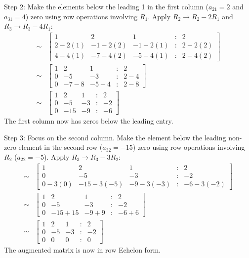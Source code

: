 \documentclass{article}
\begin{document}
Step 2: Make the elements below the leading 1 in the first column ($a_{21}=2$ and $a_{31}=4$) zero using row operations involving $R_1$.
Apply $R_2 \to R_2 - 2R_1$ and $R_3 \to R_3 - 4R_1$:
\begin{align*} \sim &\begin{bmatrix} 1 & 2 & 1 & : & 2 \\ 2 - 2(1) & -1 - 2(2) & -1 - 2(1) & : & 2 - 2(2) \\ 4 - 4(1) & -7 - 4(2) & -5 - 4(1) & : & 2 - 4(2) \end{bmatrix} \\ \sim &\begin{bmatrix} 1 & 2 & 1 & : & 2 \\ 0 & -5 & -3 & : & 2 - 4 \\ 0 & -7 - 8 & -5 - 4 & : & 2 - 8 \end{bmatrix} \\ \sim &\begin{bmatrix} 1 & 2 & 1 & : & 2 \\ 0 & -5 & -3 & : & -2 \\ 0 & -15 & -9 & : & -6 \end{bmatrix}\end{align*}
The first column now has zeros below the leading entry.

Step 3: Focus on the second column. Make the element below the leading non-zero element in the second row ($a_{32}=-15$) zero using row operations involving $R_2$ ($a_{22}=-5$).
Apply $R_3 \to R_3 - 3R_2$:
\begin{align*} \sim &\begin{bmatrix} 1 & 2 & 1 & : & 2 \\ 0 & -5 & -3 & : & -2 \\ 0 - 3(0) & -15 - 3(-5) & -9 - 3(-3) & : & -6 - 3(-2) \end{bmatrix} \\ \sim &\begin{bmatrix} 1 & 2 & 1 & : & 2 \\ 0 & -5 & -3 & : & -2 \\ 0 & -15 + 15 & -9 + 9 & : & -6 + 6 \end{bmatrix} \\ \sim &\begin{bmatrix} 1 & 2 & 1 & : & 2 \\ 0 & -5 & -3 & : & -2 \\ 0 & 0 & 0 & : & 0 \end{bmatrix}\end{align*}
The augmented matrix is now in row Echelon form.
\end{document}
